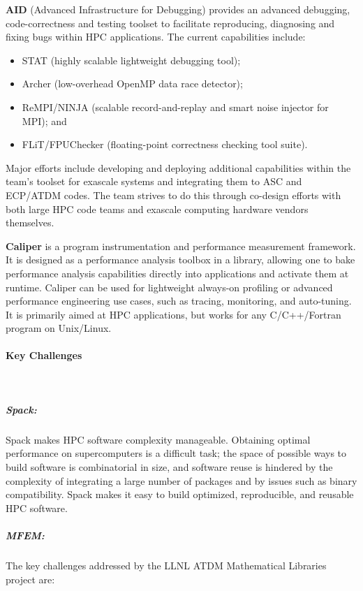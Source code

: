 \textbf{AID} (Advanced Infrastructure for Debugging) provides an advanced
debugging, code-correctness and testing toolset to facilitate
reproducing, diagnosing and fixing bugs within HPC applications. The
current capabilities include:

\begin{itemize}
\item STAT (highly scalable lightweight debugging tool);
\item Archer (low-overhead OpenMP data race detector);
\item ReMPI/NINJA (scalable record-and-replay and smart noise injector for MPI); and
\item FLiT/FPUChecker (floating-point correctness checking tool suite).
\end{itemize}

Major efforts include developing and deploying additional capabilities
within the team’s toolset for exascale systems and integrating them to
ASC and ECP/ATDM codes. The team strives to do this through co-design
efforts with both large HPC code teams and exascale computing hardware
vendors themselves.

\textbf{Caliper} is a program instrumentation and performance measurement
framework. It is designed as a performance analysis toolbox in a library,
allowing one to bake performance analysis capabilities directly into
applications and activate them at runtime. Caliper can be used for
lightweight always-on profiling or advanced performance engineering use
cases, such as tracing, monitoring, and auto-tuning. It is primarily
aimed at HPC applications, but works for any C/C++/Fortran program on
Unix/Linux.


\paragraph{Key  Challenges} \leavevmode \\

\subparagraph{Spack:}
Spack makes HPC software complexity manageable. Obtaining optimal
performance on supercomputers is a difficult task; the space of possible
ways to build software is combinatorial in size, and software reuse is
hindered by the complexity of integrating a large number of packages and
by issues such as binary compatibility.  Spack makes it easy to build
optimized, reproducible, and reusable HPC software.

\subparagraph{MFEM:}
The key challenges addressed by the LLNL ATDM Mathematical Libraries project are:


